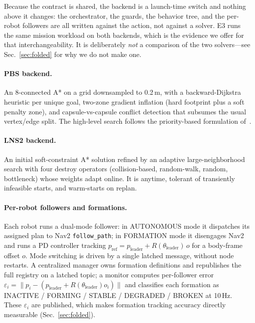 \documentclass[10pt,twocolumn]{article}
\newcommand{\code}[1]{\texttt{\small #1}}
\begin{document}
Because the contract is shared, the backend is a launch-time switch and nothing
above it changes: the orchestrator, the guards, the behavior tree, and the
per-robot followers are all written against the action, not against a solver.
E3 runs the same mission workload on both backends, which is the evidence we
offer for that interchangeability. It is deliberately \emph{not} a comparison of
the two solvers---see Sec.~\ref{sec:folded} for why we do not make one.

\paragraph{PBS backend.}
An 8-connected A* on a grid downsampled to 0.2\,m, with a backward-Dijkstra
heuristic per unique goal, two-zone gradient inflation (hard footprint plus a
soft penalty zone), and capsule-vs-capsule conflict detection that subsumes the
usual vertex/edge split. The high-level search follows the priority-based
formulation of~\cite{pbs}.

\paragraph{LNS2 backend.}
An initial soft-constraint A* solution refined by an adaptive
large-neighborhood search with four destroy operators (collision-based,
random-walk, random, bottleneck) whose weights adapt online. It is anytime,
tolerant of transiently infeasible starts, and warm-starts on replan.

\paragraph{Per-robot followers and formations.}
Each robot runs a dual-mode follower: in AUTONOMOUS mode it dispatches its
assigned plan to Nav2 \code{follow\_path}; in FORMATION mode it disengages Nav2
and runs a PD controller tracking
$p_{\mathrm{ref}} = p_{\mathrm{leader}} + R(\theta_{\mathrm{leader}})\,o$
for a body-frame offset $o$. Mode switching is driven by a single latched
message, without node restarts. A centralized manager owns formation
definitions and republishes the full registry on a latched topic; a monitor
computes per-follower error
$\varepsilon_i = \lVert p_i - (p_{\mathrm{leader}} + R(\theta_{\mathrm{leader}}) o_i) \rVert$
and classifies each formation as INACTIVE / FORMING / STABLE / DEGRADED /
BROKEN at 10\,Hz. These $\varepsilon_i$ are published, which makes formation
tracking accuracy directly measurable (Sec.~\ref{sec:folded}).
\end{document}
